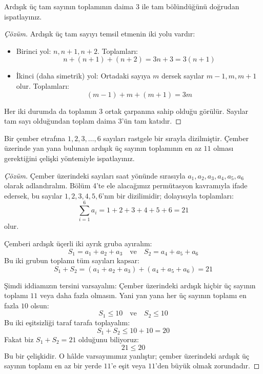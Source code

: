 \begin{example}
Ardışık üç tam sayının toplamının daima $3$ ile tam bölündüğünü doğrudan ispatlayınız.
\end{example}
\begin{proof}[Çözüm]
Ardışık üç tam sayıyı temsil etmenin iki yolu vardır:
\begin{itemize}
  \item Birinci yol: $n, n+1, n+2$. Toplamları:
  \[ n + (n+1) + (n+2) = 3n + 3 = 3(n+1) \]
  \item İkinci (daha simetrik) yol: Ortadaki sayıya $m$ dersek sayılar $m-1, m, m+1$ olur. Toplamları:
  \[ (m-1) + m + (m+1) = 3m \]
\end{itemize}
Her iki durumda da toplamın $3$ ortak çarpanına sahip olduğu görülür. Sayılar tam sayı olduğundan toplam daima $3$'ün tam katıdır.
\end{proof}

\begin{example}
Bir çember etrafına $1, 2, 3, \dots, 6$ sayıları rastgele bir sırayla dizilmiştir. Çember üzerinde yan yana bulunan ardışık üç sayının toplamının en az $11$ olması gerektiğini çelişki yöntemiyle ispatlayınız.
\end{example}
\begin{proof}[Çözüm]
Çember üzerindeki sayıları saat yönünde sırasıyla $a_1, a_2, a_3, a_4, a_5, a_6$ olarak adlandıralım. Bölüm 4'te ele alacağımız permütasyon kavramıyla ifade edersek, bu sayılar $1, 2, 3, 4, 5, 6$'nın bir dizilimidir; dolayısıyla toplamları:
\[ \sum_{i=1}^6 a_i = 1 + 2 + 3 + 4 + 5 + 6 = 21 \]
olur.

Çemberi ardışık üçerli iki ayrık gruba ayıralım:
\[ S_1 = a_1 + a_2 + a_3 \quad \text{ve} \quad S_2 = a_4 + a_5 + a_6 \]
Bu iki grubun toplamı tüm sayıları kapsar:
\[ S_1 + S_2 = (a_1 + a_2 + a_3) + (a_4 + a_5 + a_6) = 21 \]

Şimdi iddiamızın tersini varsayalım: Çember üzerindeki ardışık hiçbir üç sayının toplamı $11$ veya daha fazla olmasın. Yani yan yana her üç sayının toplamı en fazla $10$ olsun:
\[ S_1 \le 10 \quad \text{ve} \quad S_2 \le 10 \]
Bu iki eşitsizliği taraf tarafa toplayalım:
\[ S_1 + S_2 \le 10 + 10 = 20 \]
Fakat biz $S_1 + S_2 = 21$ olduğunu biliyoruz:
\[ 21 \le 20 \]
Bu bir çelişkidir. O hâlde varsayımımız yanlıştır; çember üzerindeki ardışık üç sayının toplamı en az bir yerde $11$'e eşit veya $11$'den büyük olmak zorundadır.
\end{proof}
